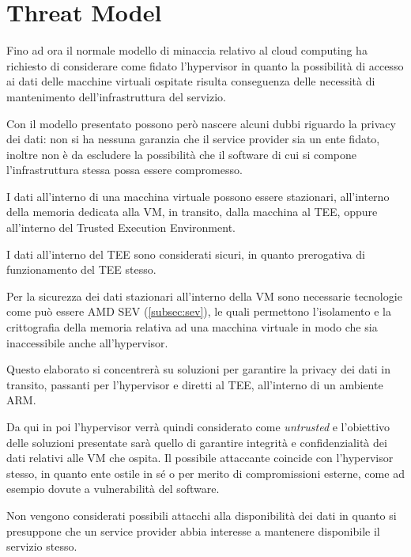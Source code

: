 \documentclass[12pt,italian]{report}
\begin{document}
	
	\newpage
	
	\section{Threat Model}
	\label{sec:threat_model}
	Fino ad ora il normale modello di minaccia relativo al cloud computing ha richiesto di considerare come fidato l'hypervisor in quanto la possibilità di accesso ai dati delle macchine virtuali ospitate risulta conseguenza delle necessità di mantenimento dell'infrastruttura del servizio.
	
	Con il modello presentato possono però nascere alcuni dubbi riguardo la privacy dei dati: non si ha nessuna garanzia che il service provider sia un ente fidato, inoltre non è da escludere la possibilità che il software di cui si compone l'infrastruttura stessa possa essere compromesso.
	
	\bigbreak
	
	I dati all'interno di una macchina virtuale possono essere stazionari, all'interno della memoria dedicata alla VM, in transito, dalla macchina al TEE, oppure all'interno del Trusted Execution Environment.
	
	I dati all'interno del TEE sono considerati sicuri, in quanto prerogativa di funzionamento del TEE stesso.
	
	Per la sicurezza dei dati stazionari all'interno della VM sono necessarie tecnologie come può essere AMD SEV (\ref{subsec:sev}), le quali permettono l'isolamento e la crittografia della memoria relativa ad una macchina virtuale in modo che sia inaccessibile anche all'hypervisor.
	
	Questo elaborato si concentrerà su soluzioni per garantire la privacy dei dati in transito, passanti per l'hypervisor e diretti al TEE, all'interno di un ambiente ARM. 
	
	\bigbreak
	
	Da qui in poi l'hypervisor verrà quindi considerato come \textit{untrusted} e l'obiettivo delle soluzioni presentate sarà quello di garantire integrità e confidenzialità dei dati relativi alle VM che ospita. Il possibile attaccante coincide con l'hypervisor stesso, in quanto ente ostile in sé o per merito di compromissioni esterne, come ad esempio dovute a vulnerabilità del software.
	
	Non vengono considerati possibili attacchi alla disponibilità dei dati in quanto si presuppone che un service provider abbia interesse a mantenere disponibile il servizio stesso.
	
\end{document}
